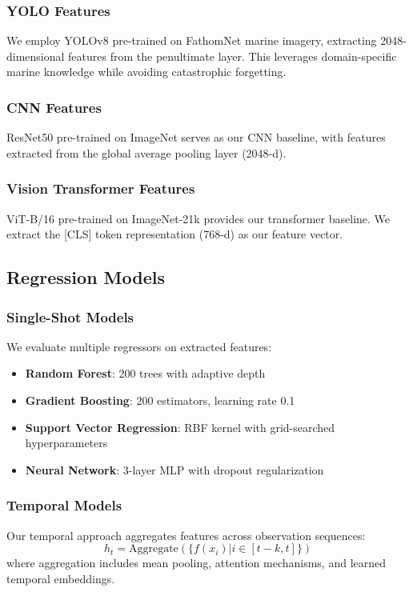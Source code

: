\documentclass[10pt,twocolumn,letterpaper]{article}
\begin{document}
\subsubsection{YOLO Features}
We employ YOLOv8 pre-trained on FathomNet marine imagery, extracting 2048-dimensional features from the penultimate layer. This leverages domain-specific marine knowledge while avoiding catastrophic forgetting.

\subsubsection{CNN Features}
ResNet50 pre-trained on ImageNet serves as our CNN baseline, with features extracted from the global average pooling layer (2048-d).

\subsubsection{Vision Transformer Features}
ViT-B/16 pre-trained on ImageNet-21k provides our transformer baseline. We extract the [CLS] token representation (768-d) as our feature vector.

\subsection{Regression Models}

\subsubsection{Single-Shot Models}
We evaluate multiple regressors on extracted features:
\begin{itemize}
\item \textbf{Random Forest}: 200 trees with adaptive depth
\item \textbf{Gradient Boosting}: 200 estimators, learning rate 0.1
\item \textbf{Support Vector Regression}: RBF kernel with grid-searched hyperparameters
\item \textbf{Neural Network}: 3-layer MLP with dropout regularization
\end{itemize}

\subsubsection{Temporal Models}
Our temporal approach aggregates features across observation sequences:
\begin{equation}
h_t = \text{Aggregate}(\{f(x_i) | i \in [t-k, t]\})
\end{equation}
where aggregation includes mean pooling, attention mechanisms, and learned temporal embeddings.
\end{document}
